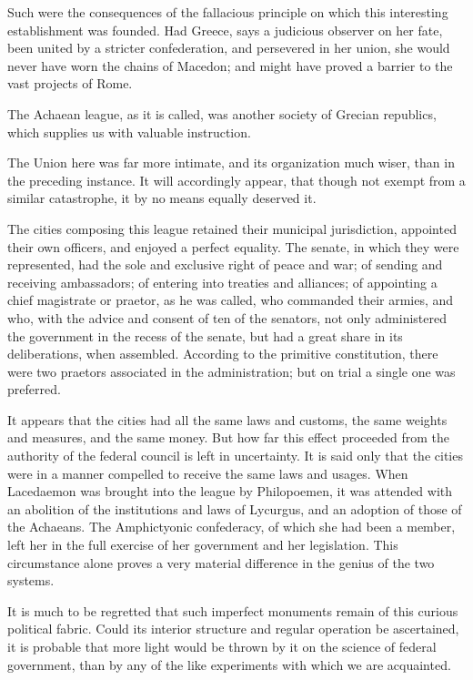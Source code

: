 Such were the consequences of the fallacious principle on which this interesting establishment was founded. Had Greece, says a judicious observer on her fate, been united by a stricter confederation, and persevered in her union, she would never have worn the chains of Macedon; and might have proved a barrier to the vast projects of Rome.

The Achaean league, as it is called, was another society of Grecian republics, which supplies us with valuable instruction.

The Union here was far more intimate, and its organization much wiser, than in the preceding instance. It will accordingly appear, that though not exempt from a similar catastrophe, it by no means equally deserved it.

The cities composing this league retained their municipal jurisdiction, appointed their own officers, and enjoyed a perfect equality. The senate, in which they were represented, had the sole and exclusive right of peace and war; of sending and receiving ambassadors; of entering into treaties and alliances; of appointing a chief magistrate or praetor, as he was called, who commanded their armies, and who, with the advice and consent of ten of the senators, not only administered the government in the recess of the senate, but had a great share in its deliberations, when assembled. According to the primitive constitution, there were two praetors associated in the administration; but on trial a single one was preferred.

It appears that the cities had all the same laws and customs, the same weights and measures, and the same money. But how far this effect proceeded from the authority of the federal council is left in uncertainty. It is said only that the cities were in a manner compelled to receive the same laws and usages. When Lacedaemon was brought into the league by Philopoemen, it was attended with an abolition of the institutions and laws of Lycurgus, and an adoption of those of the Achaeans. The Amphictyonic confederacy, of which she had been a member, left her in the full exercise of her government and her legislation. This circumstance alone proves a very material difference in the genius of the two systems.

It is much to be regretted that such imperfect monuments remain of this curious political fabric. Could its interior structure and regular operation be ascertained, it is probable that more light would be thrown by it on the science of federal government, than by any of the like experiments with which we are acquainted.

